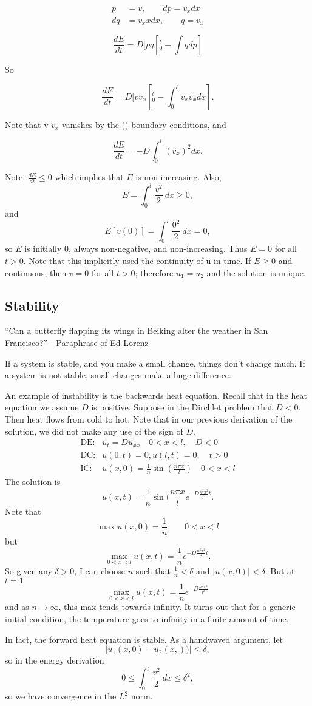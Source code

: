 \documentclass{article}
\begin{document}
\begin{align*}
p&=v, \qquad dp = v_x dx\\
dq&= v_xx dx, \qquad q = v_x
\end{align*}

$$\frac{dE}{dt} = D \Big[ pq [_0^l - \int q dp ]$$

So

$$\frac{dE}{dt} = D[vv_x [_0^l - \int_0^l v_x v_x dx ].$$

Note that v $v_x$ vanishes by the (\smiley) boundary conditions, and

$$\frac{dE}{dt} = - D \int_0^l (v_x)^2 dx.$$

Note, $\frac{dE}{dt} \leq 0$ which implies that $E$ is non-increasing. Also,
$$E = \int_0^l \frac{v^2}{2} ~dx \geq 0,$$
and
$$E[v(0)] = \int_0^l \frac{0^2}{2} ~dx = 0,$$
so $E$ is initially $0$, always non-negative, and non-increasing. Thus $E = 0$ for all $t > 0$. 
Note that this implicitly used the continuity of u in time.
If $E \geq 0$ and continuous, then $v = 0$  for all $t > 0$; therefore $u_1 = u_2$ and the solution is unique.

\subsection{Stability}
``Can a butterfly flapping its wings in Beiking alter the weather in San Francisco?'' - Paraphrase of Ed Lorenz

If a system is stable, and you make a small change, things don't change much. If a system is not stable, small changes make a huge difference.

An example of instability is the backwards heat equation. Recall that in the heat equation we assume $D$ is positive. Suppose in the Dirchlet problem that $D < 0$. Then heat flows from cold to hot. Note that in our previous derivation of the solution, we did not make any use of the sign of $D$.
\begin{align*}
\text{DE:}& u_t = Du_{xx} \quad 0 < x < l, \quad D < 0 \\
\text{DC:}& u(0,t) = 0, u(l,t) = 0, \quad t > 0 \\
\text{IC:}& u(x,0) = \frac{1}{n} \sin(\frac{n \pi x}{l}) \quad 0 < x <l
\end{align*}
The solution is
$$u(x,t) = \frac{1}{n} \sin(\frac{n \pi x}{l} e^{-D \frac{n^2 \pi^2}{l^2} t}.$$
Note that
$$\max u(x,0) = \frac{1}{n} \qquad 0 < x < l$$
but
$$ \max_{0 < x < l} u(x,t) = \frac{1}{n} e^{-D \frac{n^2 \pi^2 }{l^2} t}.$$
So given any $\delta > 0$, I can choose $n$ such that $\frac{1}{n} < \delta$ and $|u(x,0)| < \delta$.
But at $t = 1$
$$\max_{0 < x < l} u(x,t) = \frac{1}{n} e^{-D\frac{n^2 \pi^2}{l^2}}$$
and as $n \to \infty$, this max tends towards infinity. It turns out that for a generic initial condition, the temperature goes to infinity in a finite amount of time.

In fact, the forward heat equation is stable. As a handwaved argument, let
$$|u_1(x,0) - u_2(x,))| \leq \delta,$$
so in the energy derivation
$$0 \leq \int_0^l \frac{v^2}{2} ~dx \leq \delta^2,$$
so we have convergence in the $L^2$ norm.
\end{document}
